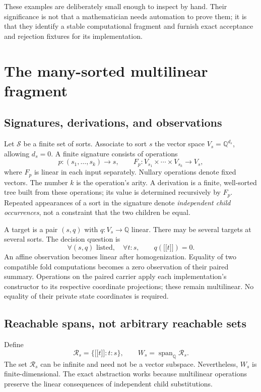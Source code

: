 \documentclass[11pt,letterpaper]{article}
\theoremstyle{definition}\newtheorem{definition}[theorem]{Definition}
\theoremstyle{remark}\newtheorem{remark}[theorem]{Remark}
\newcommand{\Q}{\mathbb Q}
\newcommand{\Span}{\operatorname{span}}
\newcommand{\eval}[1]{\mathopen{[\![}#1\mathclose{]\!]}}
\begin{document}
These examples are deliberately small enough to inspect by hand. Their significance is not that a mathematician needs automation to prove them; it is that they identify a stable computational fragment and furnish exact acceptance and rejection fixtures for its implementation.

\section{The many-sorted multilinear fragment}
\label{sec:fragment}

\subsection{Signatures, derivations, and observations}
Let $\mathcal S$ be a finite set of sorts. Associate to sort $s$ the vector space $V_s=\Q^{d_s}$, allowing $d_s=0$. A finite signature consists of operations
\[
 p:(s_1,\ldots,s_k)\to s,
 \qquad F_p:V_{s_1}\times\cdots\times V_{s_k}\to V_s,
\]
where $F_p$ is linear in each input separately. Nullary operations denote fixed vectors. The number $k$ is the operation's arity. A derivation is a finite, well-sorted tree built from these operations; its value is determined recursively by $F_p$. Repeated appearances of a sort in the signature denote \emph{independent child occurrences}, not a constraint that the two children be equal.

A target is a pair $(s,q)$ with $q:V_s\to\Q$ linear. There may be several targets at several sorts. The decision question is
\begin{equation}\label{eq:zero-problem}
 \forall (s,q)\text{ listed},\quad\forall t:s,\qquad q(\eval t)=0.
\end{equation}
An affine observation becomes linear after homogenization. Equality of two compatible fold computations becomes a zero observation of their paired summary. Operations on the paired carrier apply each implementation's constructor to its respective coordinate projections; these remain multilinear. No equality of their private state coordinates is required.

\subsection{Reachable spans, not arbitrary reachable sets}
Define
\[
 \mathcal R_s=\{\eval t:t:s\},\qquad W_s=\Span_\Q\mathcal R_s.
\]
The set $\mathcal R_s$ can be infinite and need not be a vector subspace. Nevertheless, $W_s$ is finite-dimensional. The exact abstraction works because multilinear operations preserve the linear consequences of independent child substitutions.
\end{document}
